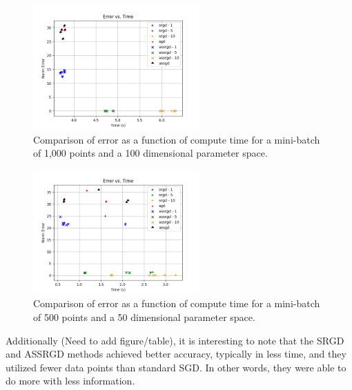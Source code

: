 \documentclass[,conference,compsoc]{IEEEtran}
\begin{document}
\begin{figure}[!t]
    \centering
    \includegraphics[width=2.5in]{dim-100-batch-1000}
    \caption{Comparison of error as a function of compute time for a mini-batch
    of 1,000 points and a 100 dimensional parameter space.}
    \label{fig:dim10}
\end{figure}
\begin{figure}[!t]
    \centering
    \includegraphics[width=2.5in]{dim-50-batch-500}
    \caption{Comparison of error as a function of compute time for a mini-batch
        of 500 points and a 50 dimensional parameter space.}
    \label{fig:dim50}
\end{figure}

Additionally (Need to add figure/table), it is interesting to note that the
SRGD and ASSRGD methods achieved better accuracy, typically in less time, and
they utilized fewer data points than standard SGD. In other words, they were
able to do more with less information.

%
%
\end{document}
